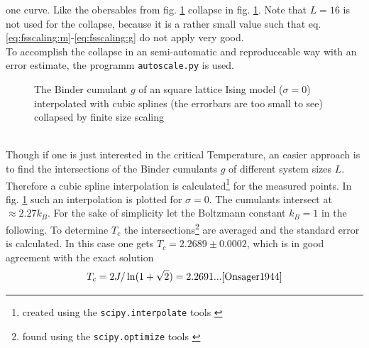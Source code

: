     one curve. Like the obersables from fig. \ref{fig:gettingCrit}
    collapse in fig. \ref{fig:gettingCrit}.
    Note that \(L=16\) is not used for the collapse, because it is a
    rather small value such that eq. \eqref{eq:fsscaling:m}-\eqref{eq:fsscaling:g}
    do not apply very good.\\
    To accomplish the collapse in an semi-automatic and reproduceable
    way with an error estimate, the programm
    \texttt{autoscale.py} \cite{autoscale2009} is used.
    \begin{figure}[htbp]
        \centering
        \caption[Examples of determining critical temperature and exponents]
                {The Binder cumulant \(g\) of an square lattice Ising model
                 (\(\sigma=0\))\\
                  interpolated
                    with cubic splines (the errorbars are too small to see)\\
                  collapsed by finite
                    size scaling
                }
        \label{fig:gettingCrit}
    \end{figure}\\
    Though if one is just interested in the critical Temperature, an
    easier approach is to find the intersections of the Binder cumulants
    \(g\) of different system sizes \(L\).
    Therefore a cubic spline interpolation is calculated\footnote{created using the \texttt{scipy.interpolate} tools \cite{scipy2001}}
    for the measured points.
    In fig. \ref{fig:gettingCrit}
    such an interpolation is plotted for \(\sigma=0\). The cumulants
    intersect at \(\approx 2.27 k_{B}\). For the sake of simplicity let
    the Boltzmann constant \(k_{B}=1\) in the following.
    To determine \(T_c\) the intersections\footnote{found using the \texttt{scipy.optimize} tools \cite{scipy2001}}
    are averaged and the standard error is calculated. In this case one
    gets \(T_c = 2.2689\pm0.0002\), which is in good agreement with the
    exact solution
    \begin{equation}
        T_c = 2J/\ln(1+\sqrt 2) = 2.2691... \cite{Onsager1944}
        \label{eq:exactTc}
    \end{equation}

